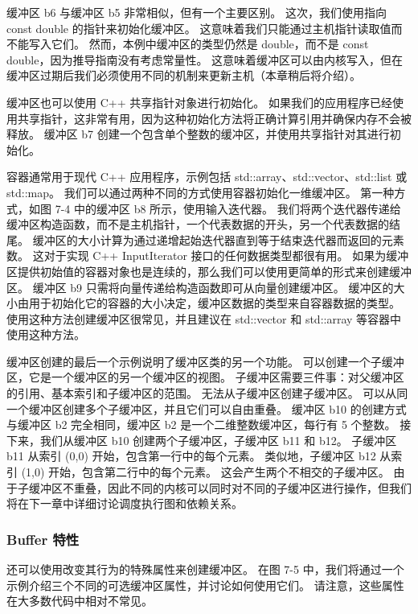 缓冲区 b6 与缓冲区 b5 非常相似，但有一个主要区别。 这次，我们使用指向 const double 的指针来初始化缓冲区。 这意味着我们只能通过主机指针读取值而不能写入它们。 然而，本例中缓冲区的类型仍然是 double，而不是 const double，因为推导指南没有考虑常量性。 这意味着缓冲区可以由内核写入，但在缓冲区过期后我们必须使用不同的机制来更新主机（本章稍后将介绍）。

缓冲区也可以使用 C++ 共享指针对象进行初始化。 如果我们的应用程序已经使用共享指针，这非常有用，因为这种初始化方法将正确计算引用并确保内存不会被释放。 缓冲区 b7 创建一个包含单个整数的缓冲区，并使用共享指针对其进行初始化。

容器通常用于现代 C++ 应用程序，示例包括 std::array、std::vector、std::list 或 std::map。 我们可以通过两种不同的方式使用容器初始化一维缓冲区。 第一种方式，如图 7-4 中的缓冲区 b8 所示，使用输入迭代器。 我们将两个迭代器传递给缓冲区构造函数，而不是主机指针，一个代表数据的开头，另一个代表数据的结尾。 缓冲区的大小计算为通过递增起始迭代器直到等于结束迭代器而返回的元素数。 这对于实现 C++ InputIterator 接口的任何数据类型都很有用。 如果为缓冲区提供初始值的容器对象也是连续的，那么我们可以使用更简单的形式来创建缓冲区。 缓冲区 b9 只需将向量传递给构造函数即可从向量创建缓冲区。 缓冲区的大小由用于初始化它的容器的大小决定，缓冲区数据的类型来自容器数据的类型。 使用这种方法创建缓冲区很常见，并且建议在 std::vector 和 std::array 等容器中使用这种方法。

缓冲区创建的最后一个示例说明了缓冲区类的另一个功能。 可以创建一个子缓冲区，它是一个缓冲区的另一个缓冲区的视图。 子缓冲区需要三件事：对父缓冲区的引用、基本索引和子缓冲区的范围。 无法从子缓冲区创建子缓冲区。 可以从同一个缓冲区创建多个子缓冲区，并且它们可以自由重叠。 缓冲区 b10 的创建方式与缓冲区 b2 完全相同，缓冲区 b2 是一个二维整数缓冲区，每行有 5 个整数。 接下来，我们从缓冲区 b10 创建两个子缓冲区，子缓冲区 b11 和 b12。 子缓冲区 b11 从索引 (0,0) 开始，包含第一行中的每个元素。 类似地，子缓冲区 b12 从索引 (1,0) 开始，包含第二行中的每个元素。 这会产生两个不相交的子缓冲区。 由于子缓冲区不重叠，因此不同的内核可以同时对不同的子缓冲区进行操作，但我们将在下一章中详细讨论调度执行图和依赖关系。

\subsubsection{Buffer 特性}

还可以使用改变其行为的特殊属性来创建缓冲区。 在图 7-5 中，我们将通过一个示例介绍三个不同的可选缓冲区属性，并讨论如何使用它们。 请注意，这些属性在大多数代码中相对不常见。

